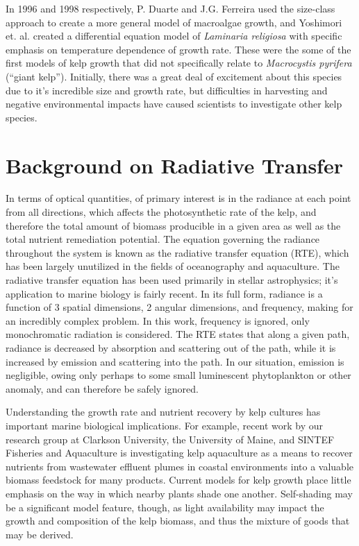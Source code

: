\documentclass[ms,cpyr,lof,lot]{uathesis}
\begin{document}
In 1996 and 1998 respectively, P. Duarte and J.G. Ferreira used the size-class approach to create a more general model of macroalgae growth, and Yoshimori et. al. created a differential equation model of \textit{Laminaria religiosa} with specific emphasis on temperature dependence of growth rate\cite{duarte_model_1997,yoshimori_mathematical_1998}.
These were the some of the first models of kelp growth that did not specifically relate to \textit{Macrocystis pyrifera} (``giant kelp''). 
Initially, there was a great deal of excitement about this species due to it's incredible size and growth rate, but difficulties in harvesting and negative environmental impacts have caused scientists to investigate other kelp species. 

\section{Background on Radiative Transfer}
In terms of optical quantities, of primary interest is in the radiance at each point from all directions, which affects the photosynthetic rate of the kelp, and therefore the total amount of biomass producible in a given area as well as the total nutrient remediation potential.
The equation governing the radiance throughout the system is known as the radiative transfer equation (RTE), which has been largely unutilized in the fields of oceanography and aquaculture.
The radiative transfer equation has been used primarily in stellar astrophysics; it's application to marine biology is fairly recent\cite{mobley_radiative_2001}.
In its full form, radiance is a function of 3 spatial dimensions, 2 angular dimensions, and frequency, making for an incredibly complex problem. 
In this work, frequency is ignored, only monochromatic radiation is considered.
The RTE states that along a given path, radiance is decreased by absorption and scattering out of the path, while it is increased by emission and scattering into the path.
In our situation, emission is negligible, owing only perhaps to some small luminescent phytoplankton or other anomaly, and can therefore be safely ignored.

Understanding the growth rate and nutrient recovery by
kelp cultures has important marine biological implications. For example, recent
work by our research group at Clarkson University, the University of Maine, and
SINTEF Fisheries and Aquaculture is investigating kelp aquaculture as a means to
recover nutrients from wastewater effluent plumes in coastal environments into a
valuable biomass feedstock for many products. Current models for kelp growth
place little emphasis on the way in which nearby plants shade one another.
Self-shading may be a significant model feature, though, as light availability
may impact the growth and composition of the kelp biomass, and thus the mixture
of goods that may be derived.
\end{document}
